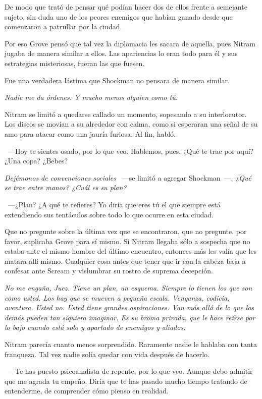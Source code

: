 De modo que trató de pensar qué podían hacer dos de ellos frente a semejante sujeto, sin duda uno de los peores enemigos que habían ganado desde que comenzaron a patrullar por la ciudad.

Por eso Grove pensó que tal vez la diplomacia les sacara de aquella, pues Nitram jugaba de manera similar a ellos. Las apariencias lo eran todo para él y sus estrategias misteriosas, fueran las que fuesen.

Fue una verdadera lástima que Shockman no pensara de manera similar.

\emph{Nadie me da órdenes. Y mucho menos alguien como tú.}

Nitram se limitó a quedarse callado un momento, sopesando a su interlocutor. Los discos se movían a su alrededor con calma, como si esperaran una señal de su amo para atacar como una jauría furiosa. Al fin, habló.

~---Hoy te sientes osado, por lo que veo. Hablemos, pues. ¿Qué te trae por aquí? ¿Una copa? ¿Bebes?

\emph{Dejémonos de convenciones sociales} ~---se limitó a agregar Shockman~---. \emph{¿Qué se trae entre manos? ¿Cuál es su plan?}

~---¿Plan? ¿A qué te refieres? Yo diría que eres tú el que siempre está extendiendo sus tentáculos sobre todo lo que ocurre en esta ciudad.

Que no pregunte sobre la última vez que se encontraron, que no pregunte, por favor, suplicaba Grove para sí mismo. Si Nitram llegaba sólo a sospecha que no estaba ante el mismo hombre del último encuentro, entonces más les valía que les matara allí mismo. Cualquier cosa antes que tener que ir con la cabeza baja a confesar ante Scream y vislumbrar su rostro de suprema decepción.

\emph{No me engaña, Juez. Tiene un plan, un esquema. Siempre lo tienen los que son como usted. Los hay que se mueven a pequeña escala. Venganza, codicia, aventura. Usted no. Usted tiene grandes aspiraciones. Van más allá de lo que los demás pueden tan siquiera imaginar. Es su broma privada, que le hace reírse por lo bajo cuando está solo y apartado de enemigos y aliados.}

Nitram parecía cuanto menos sorprendido. Raramente nadie le hablaba con tanta franqueza. Tal vez nadie solía quedar con vida después de hacerlo.

~---Te has puesto psicoanalista de repente, por lo que veo. Aunque debo admitir que me agrada tu empeño. Diría que te has pasado mucho tiempo tratando de entenderme, de comprender cómo pienso en realidad.

